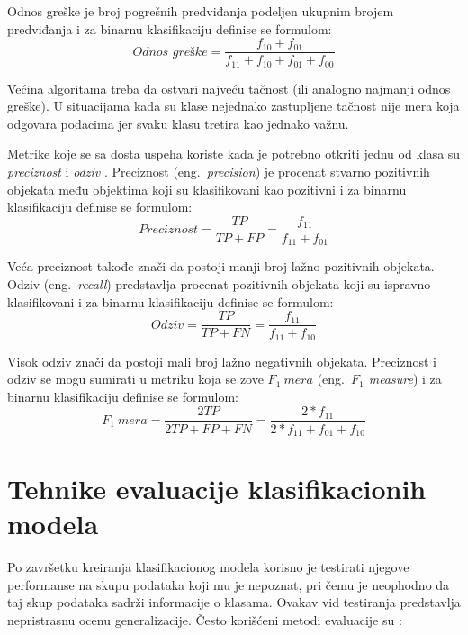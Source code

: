 \documentclass[12pt,oneside]{memoir}
\begin{document}
Odnos greške je broj pogrešnih predviđanja podeljen ukupnim brojem predviđanja i za binarnu klasifikaciju definise se formulom:
$$ \textit{Odnos greške} = \frac{f_{10}+f_{01}}{f_{11}+f_{10}+f_{01}+f_{00}} $$

Većina algoritama treba da ostvari najveću tačnost (ili analogno najmanji odnos greške). U situacijama kada su klase nejednako zastupljene tačnost nije mera koja odgovara podacima jer svaku klasu tretira kao jednako važnu. 


Metrike koje se sa dosta uspeha koriste kada je potrebno otkriti jednu od klasa su \textit{preciznost} i \textit{odziv} \cite{mitic}. Preciznost (eng.~\textit{precision}) je procenat stvarno pozitivnih objekata među objektima koji su klasifikovani kao pozitivni i za binarnu klasifikaciju definise se formulom:
$$ \textit{Preciznost} = \frac{TP}{TP+FP} = \frac{f_{11}}{f_{11}+f_{01}} $$

Veća preciznost takođe znači da postoji manji broj lažno pozitivnih objekata. Odziv (eng.~\textit{recall}) predstavlja procenat pozitivnih objekata koji su ispravno klasifikovani i za binarnu klasifikaciju definise se formulom:
$$ \textit{Odziv} = \frac{TP}{TP+FN} = \frac{f_{11}}{f_{11}+f_{10}} $$ 

Visok odziv znači da postoji mali broj lažno negativnih objekata. Preciznost i odziv se mogu sumirati u metriku koja se zove $F_1\ mera$ (eng.~\textit{$F_1$ measure}) i za binarnu klasifikaciju definise se formulom:
$$ F_1\ mera = \frac{2TP}{2TP+FP+FN} = \frac{2*f_{11}}{2*f_{11}+f_{01}+f_{10}} $$


\section{Tehnike evaluacije klasifikacionih modela} \label{evaluacija}

Po završetku kreiranja klasifikacionog modela korisno je testirati njegove performanse na skupu podataka koji mu je nepoznat, pri čemu je neophodno da taj skup podataka sadrži informacije o klasama. Ovakav vid testiranja predstavlja nepristrasnu ocenu generalizacije. Često korišćeni metodi evaluacije su  \cite{mitic, mladen, aggarwal, UMLFTA}: 
\end{document}
